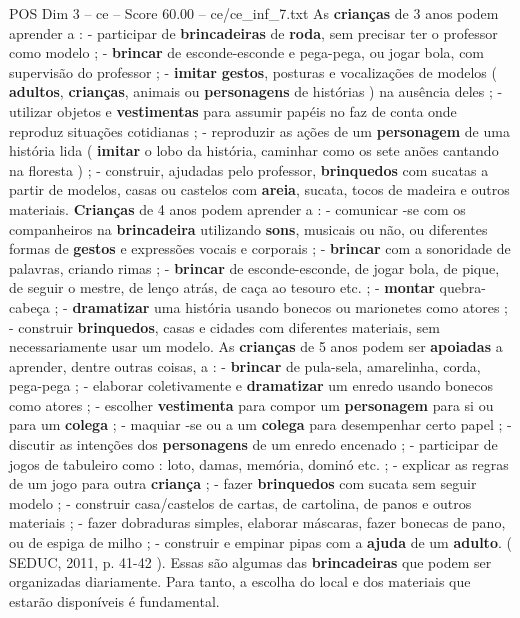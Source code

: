 \begin{textsample}{POS Dim 3 – ce – Score 60.00 – ce/ce\_inf\_7.txt}
As \textbf{crianças} de 3 anos podem aprender a : - participar de \textbf{brincadeiras} de \textbf{roda}, sem precisar ter o professor como modelo ; - \textbf{brincar} de esconde-esconde e pega-pega, ou jogar bola, com supervisão do professor ; - \textbf{imitar} \textbf{gestos}, posturas e vocalizações de modelos ( \textbf{adultos}, \textbf{crianças}, animais ou \textbf{personagens} de histórias ) na ausência deles ; - utilizar objetos e \textbf{vestimentas} para assumir papéis no faz de conta onde reproduz situações cotidianas ; - reproduzir as ações de um \textbf{personagem} de uma história lida ( \textbf{imitar} o lobo da história, caminhar como os sete anões cantando na floresta ) ; - construir, ajudadas pelo professor, \textbf{brinquedos} com sucatas a partir de modelos, casas ou castelos com \textbf{areia}, sucata, tocos de madeira e outros materiais. \textbf{Crianças} de 4 anos podem aprender a : - comunicar -se com os companheiros na \textbf{brincadeira} utilizando \textbf{sons}, musicais ou não, ou diferentes formas de \textbf{gestos} e expressões vocais e corporais ; - \textbf{brincar} com a sonoridade de palavras, criando rimas ; - \textbf{brincar} de esconde-esconde, de jogar bola, de pique, de seguir o mestre, de lenço atrás, de caça ao tesouro etc. ; - \textbf{montar} quebra-cabeça ; - \textbf{dramatizar} uma história usando bonecos ou marionetes como atores ; - construir \textbf{brinquedos}, casas e cidades com diferentes materiais, sem necessariamente usar um modelo.
As \textbf{crianças} de 5 anos podem ser \textbf{apoiadas} a aprender, dentre outras coisas, a : - \textbf{brincar} de pula-sela, amarelinha, corda, pega-pega ; - elaborar coletivamente e \textbf{dramatizar} um enredo usando bonecos como atores ; - escolher \textbf{vestimenta} para compor um \textbf{personagem} para si ou para um \textbf{colega} ; - maquiar -se ou a um \textbf{colega} para desempenhar certo papel ; - discutir as intenções dos \textbf{personagens} de um enredo encenado ; - participar de jogos de tabuleiro como : loto, damas, memória, dominó etc. ; - explicar as regras de um jogo para outra \textbf{criança} ; - fazer \textbf{brinquedos} com sucata sem seguir modelo ; - construir casa/castelos de cartas, de cartolina, de panos e outros materiais ; - fazer dobraduras simples, elaborar máscaras, fazer bonecas de pano, ou de espiga de milho ; - construir e empinar pipas com a \textbf{ajuda} de um \textbf{adulto}. ( SEDUC, 2011, p. 41-42 ).
Essas são algumas das \textbf{brincadeiras} que podem ser organizadas diariamente.
Para tanto, a escolha do local e dos materiais que estarão disponíveis é fundamental.

\end{textsample}
